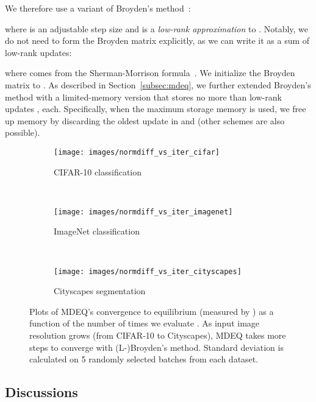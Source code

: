 \documentclass{article}
\begin{document}
We therefore use a variant of Broyden's method~\cite{broyden1965class,bai2019deep}:

where  is an adjustable step size and  is a \emph{low-rank approximation} to \small\normalsize. Notably, we do not need to form the Broyden matrix  explicitly, as we can write it as a sum of low-rank updates:

where  comes from the Sherman-Morrison formula~\cite{sherman1950adjustment}. We initialize the Broyden matrix to . As described in Section~\ref{subsec:mdeq}, we further extended Broyden's method with a limited-memory version that stores no more than  low-rank updates ,  each. Specifically, when the maximum storage memory  is used, we free up memory by discarding the oldest update in  and  (other schemes are also possible).


\begin{figure}[t]
\centering
\begin{subfigure}[b]{0.32\textwidth}
\texttt{[image: images/normdiff\_vs\_iter\_cifar]}
\vspace{-.2in}
\caption{CIFAR-10 classification}
\label{subfig:app-cifar-10}
\end{subfigure}
~
\begin{subfigure}[b]{0.32\textwidth}
\texttt{[image: images/normdiff\_vs\_iter\_imagenet]}
\vspace{-.2in}
\caption{ImageNet classification}
\label{subfig:app-imagenet}
\end{subfigure}
~
\begin{subfigure}[b]{0.32\textwidth}
\texttt{[image: images/normdiff\_vs\_iter\_cityscapes]}
\vspace{-.2in}
\caption{Cityscapes segmentation}
\label{subfig:app-cityscapes}
\end{subfigure}
\vspace{-.16in}
\caption{Plots of MDEQ's convergence to equilibrium (measured by \small\normalsize) as a function of the number of times we evaluate . As input image resolution grows (from CIFAR-10 to Cityscapes), MDEQ takes more steps to converge with (L-)Broyden's method. Standard deviation is calculated on 5 randomly selected batches from each dataset.}
\label{fig:app-convergence}
\vspace{-.15in}
\end{figure}

\subsection{Discussions}
\label{app:discussions}
\end{document}
